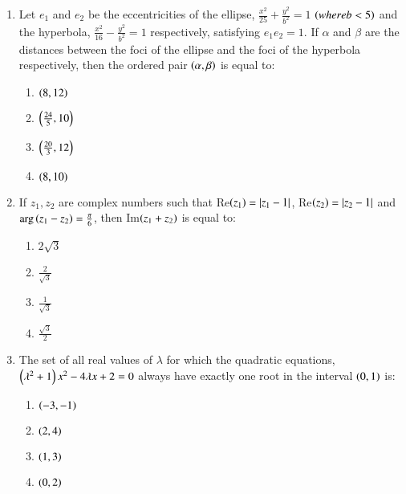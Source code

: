 \documentclass[journal,9pt,twocolumn]{IEEEtran}
\begin{document}
\begin{enumerate}
\item  Let $e_1$ and $e_2$ be the eccentricities of the ellipse, $\frac{x^2}{25} + \frac{y^2}{b^2} = 1$ $\left(where b < 5\right)$ and the hyperbola, $\frac{x^2}{16} - \frac{y^2}{b^2} = 1$ respectively, satisfying $e_1 e_2 = 1$. If $\alpha$ and $\beta$ are the distances between the foci of the ellipse and the foci of the hyperbola respectively, then the ordered pair $\left(\alpha, \beta\right)$ is equal to:
        \begin{multicols}{2}

\begin{enumerate}
    \item $\left(8, 12\right)$
    \item $\left(\frac{24}{5}, 10\right)$
    \item $\left(\frac{20}{3}, 12\right)$
    \item $\left(8, 10\right)$
\end{enumerate}
\end{multicols}

\item If $z_1, z_2$ are complex numbers such that Re$\left(z_1\right) = \left\vert z_1 - 1\right\vert$, Re$\left(z_2\right) = \left\vert z_2 - 1\right\vert$ and $\arg\left(z_1 - z_2\right) = \frac{\pi}{6}$, then Im$\left(z_1 + z_2\right)$ is equal to:
        \begin{multicols}{4}

\begin{enumerate}
    \item $2\sqrt{3}$
    \item $\frac{2}{\sqrt{3}}$
    \item $\frac{1}{\sqrt{3}}$
    \item $\frac{\sqrt{3}}{2}$
\end{enumerate}
\end{multicols}

\item The set of all real values of $\lambda$ for which the quadratic equations, $\left(\lambda^2 + 1\right)x^2 - 4\lambda x + 2 = 0$ always have exactly one root in the interval $\left(0, 1\right)$ is:
        
        \begin{multicols}{2}
\begin{enumerate}
    \item $\left(-3, -1\right)$
    \item $\left(2, 4\right)$
    \item $\left(1, 3\right)$
    \item $\left(0, 2\right)$
\end{enumerate}
\end{multicols}


\end{enumerate}
\end{document}
